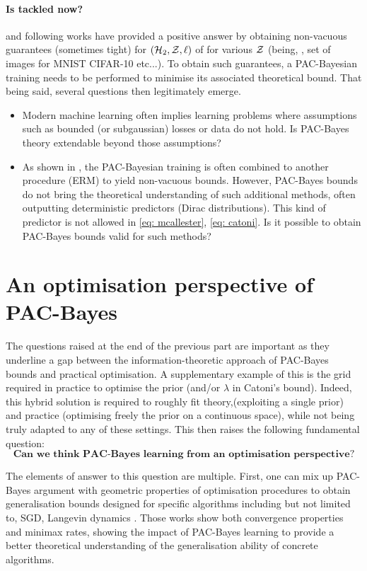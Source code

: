 \paragraph{Is  tackled now?}
\citep{dziugaite2017computing} and following works have provided a positive answer by obtaining non-vacuous guarantees (sometimes tight) for $(\mathcal{H}_2,\mathcal{Z},\ell)$ of  for various $\mathcal{Z}$ (being, \eg, set of images for MNIST CIFAR-10 etc...). To obtain such guarantees, a PAC-Bayesian training needs to be performed to minimise its associated theoretical bound. That being said, several questions then legitimately emerge.

\begin{itemize}
  \item Modern machine learning often implies learning problems where assumptions such as bounded (or subgaussian) losses or \iid data do not hold. Is PAC-Bayes theory extendable beyond those assumptions? 
  \item As shown in \citet{dziugaite2017computing}, the PAC-Bayesian training is often combined to another procedure (\eg ERM) to yield non-vacuous bounds. However, PAC-Bayes bounds do not bring the theoretical understanding of such additional methods, often outputting deterministic predictors (\ie Dirac distributions). This kind of predictor is not allowed in \eqref{eq: mcallester}, \eqref{eq: catoni}. Is it possible to obtain PAC-Bayes bounds valid for such methods? 
\end{itemize}



\section{An optimisation perspective of PAC-Bayes}

The questions raised at the end of the previous part are important as they underline a gap between the information-theoretic approach of PAC-Bayes bounds and practical optimisation. A supplementary example of this is the grid required in practice to optimise the prior (and/or $\lambda$ in Catoni's bound). Indeed, this hybrid solution is required to roughly fit theory,(exploiting a single prior) and practice (optimising freely the prior on a continuous space), while not being truly adapted to any of these settings. This then raises the following fundamental question:
\[ \textbf{Can we think PAC-Bayes learning from an optimisation perspective?} \]

The elements of answer to this question are multiple. First, one can mix up PAC-Bayes argument with geometric properties of optimisation procedures to obtain generalisation bounds designed for specific algorithms including but not limited to, SGD, Langevin dynamics  \citep{london2017pac,dziugaite2018entropy,neu2021info,clerico2022generalisation,haghifam2023limit,zhou2023toward}. Those works show both convergence properties and minimax rates, showing the impact of PAC-Bayes learning to provide a better theoretical understanding of the generalisation ability of concrete algorithms. 

